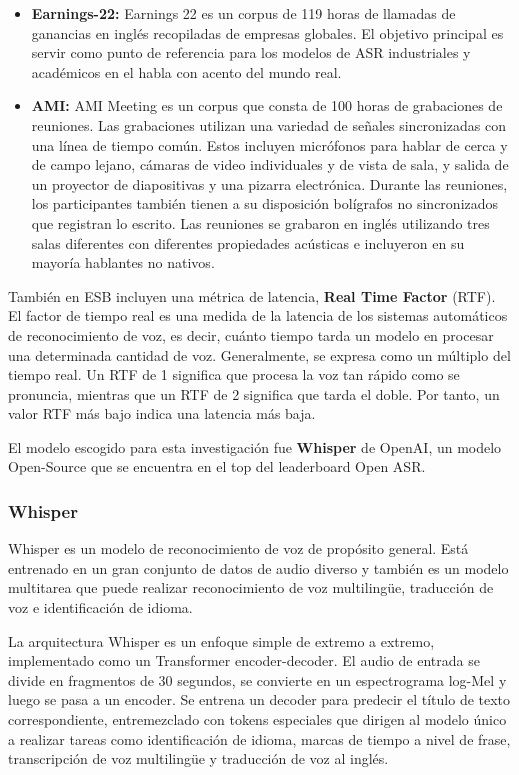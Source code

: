 \documentclass[conference]{IEEEtran}
\begin{document}
\begin{itemize}
    \item \textbf{Earnings-22:} Earnings 22 \cite{delrio2022earnings22} es un corpus de 119 horas de llamadas de ganancias en inglés recopiladas de empresas globales. El objetivo principal es servir como punto de referencia para los modelos de ASR industriales y académicos en el habla con acento del mundo real.
    \item \textbf{AMI:} AMI Meeting \cite{Platen_2019} es un corpus que consta de 100 horas de grabaciones de reuniones. Las grabaciones utilizan una variedad de señales sincronizadas con una línea de tiempo común. Estos incluyen micrófonos para hablar de cerca y de campo lejano, cámaras de video individuales y de vista de sala, y salida de un proyector de diapositivas y una pizarra electrónica. Durante las reuniones, los participantes también tienen a su disposición bolígrafos no sincronizados que registran lo escrito. Las reuniones se grabaron en inglés utilizando tres salas diferentes con diferentes propiedades acústicas e incluyeron en su mayoría hablantes no nativos.
\end{itemize}

También en ESB incluyen una métrica de latencia, \textbf{Real Time Factor} (RTF). El factor de tiempo real es una medida de la latencia de los sistemas automáticos de reconocimiento de voz, es decir, cuánto tiempo tarda un modelo en procesar una determinada cantidad de voz. Generalmente, se expresa como un múltiplo del tiempo real. Un RTF de 1 significa que procesa la voz tan rápido como se pronuncia, mientras que un RTF de 2 significa que tarda el doble. Por tanto, un valor RTF más bajo indica una latencia más baja.

El modelo escogido para esta investigación fue \textbf{Whisper} de OpenAI, un modelo Open-Source que se encuentra en el top del leaderboard Open ASR.

\subsubsection{Whisper}
Whisper \cite{radford2022robust}  es un modelo de reconocimiento de voz de propósito general. Está entrenado en un gran conjunto de datos de audio diverso y también es un modelo multitarea que puede realizar reconocimiento de voz multilingüe, traducción de voz e identificación de idioma.

La arquitectura Whisper es un enfoque simple de extremo a extremo, implementado como un Transformer encoder-decoder. El audio de entrada se divide en fragmentos de 30 segundos, se convierte en un espectrograma log-Mel y luego se pasa a un encoder. Se entrena un decoder para predecir el título de texto correspondiente, entremezclado con tokens especiales que dirigen al modelo único a realizar tareas como identificación de idioma, marcas de tiempo a nivel de frase, transcripción de voz multilingüe y traducción de voz al inglés.
\end{document}
